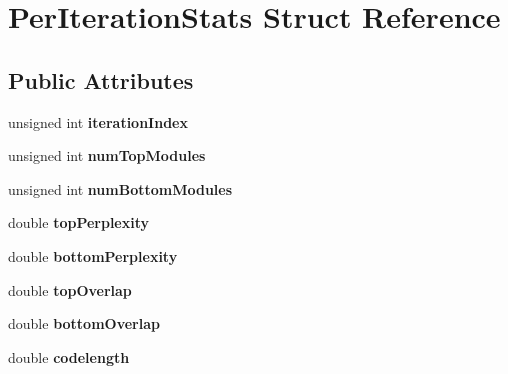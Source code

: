 \hypertarget{structPerIterationStats}{}\section{Per\+Iteration\+Stats Struct Reference}
\label{structPerIterationStats}
\subsection*{Public Attributes}
\begin{DoxyCompactItemize}
\item 
\mbox{\label{structPerIterationStats_a17d0b00b138e3a59314a10ac64b3db84}} 
unsigned int {\bfseries iteration\+Index}
\item 
\mbox{\label{structPerIterationStats_a46bbf2861ae80f9e9fe13721ea8878ec}} 
unsigned int {\bfseries num\+Top\+Modules}
\item 
\mbox{\label{structPerIterationStats_a7401710aa1c7989525d39ccd89e2fa13}} 
unsigned int {\bfseries num\+Bottom\+Modules}
\item 
\mbox{\label{structPerIterationStats_aadd6862d65f2440b3174abcfa0d76085}} 
double {\bfseries top\+Perplexity}
\item 
\mbox{\label{structPerIterationStats_a0c36807c635301073f9ffd7dd6ad65a4}} 
double {\bfseries bottom\+Perplexity}
\item 
\mbox{\label{structPerIterationStats_a148e55b1766456d23d630e6d9b801e4f}} 
double {\bfseries top\+Overlap}
\item 
\mbox{\label{structPerIterationStats_aa90e5fae7b7c389ea11cb43a69364eaf}} 
double {\bfseries bottom\+Overlap}
\item 
\mbox{\label{structPerIterationStats_a9a85252108dc56b4a4ccdcf1b5b96580}} 
double {\bfseries codelength}
\item 
\mbox{\label{structPerIterationStats_addade7a6efc84e15ba0801bf3b9522b7}} 

\end{DoxyCompactItemize}
